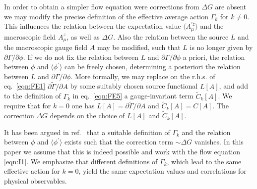 \documentclass[twocolumn,aps,prd,amsmath,amssymb,preprintnumbers,longbibliography]{revtex4-1}
\numberwithin{equation}{section}
\begin{document}
\begin{appendices}
In order to obtain a simpler flow equation were corrections from $\Delta G$ are absent we may modify the precise definition of the effective average action $\Gamma_k$ for $k \neq 0$. This influences the relation between the expectation value $\langle A_\mu^{\prime z}\rangle$ and the macroscopic field $A_\mu^z$, as well as $\Delta G$. Also the relation between the source $L$ and the macroscopic gauge field $A$ may be modified, such that $L$ is no longer given by $\partial \Gamma/\partial \phi$. If we do not fix the relation between $L$ and $\partial \Gamma/\partial \phi$ a priori, the relation between $\phi$ and $\langle \phi^\prime\rangle$ can be freely chosen, determining a posteriori the relation between $L$ and $\partial \Gamma/\partial \phi$. More formally, we may replace on the r.h.s. of eq.~\eqref{eqn:FE1} $\partial \tilde\Gamma/\partial A$ by some suitably chosen source functional $L[A]$, and add to the definition of $\Gamma_k$ in eq.~\eqref{eqn:FE5} a gauge-invariant term $\tilde{C}_k[A]$. We require that for $k = 0$ one has $L[A] = \partial \tilde\Gamma/\partial A$ and $\tilde{C}_k[A] = C[A]$. The correction $\Delta G$ depends on the choice of $L[A]$ and $\tilde{C}_k[A]$.

It has been argued in ref.~\cite{CWGIF} that a suitable definition of $\Gamma_k$ and the relation between $\phi$ and $\langle \phi^\prime\rangle$ exists such that the correction term $\sim \Delta G$ vanishes. In this paper we assume that this is indeed possible and work with the flow equation \eqref{eqn:I1}. We emphasize that different definitions of $\Gamma_k$, which lead to the same effective action for $k = 0$, yield the same expectation values and correlations for physical observables.

\end{appendices}








\end{document}
